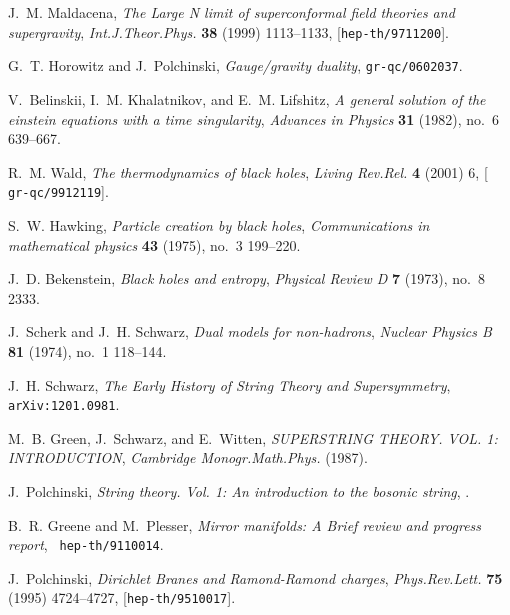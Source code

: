 \documentclass[12pt,a4paper]{article}
\begin{document}
\providecommand{\href}[2]{#2}\begingroup\raggedright\begin{thebibliography}{100}

J.~M. Maldacena, {\it {The Large N limit of superconformal field theories and
  supergravity}},  {\em Int.J.Theor.Phys.} {\bf 38} (1999) 1113--1133,
  [\href{http://xxx.lanl.gov/abs/hep-th/9711200}{{\tt hep-th/9711200}}].

G.~T. Horowitz and J.~Polchinski, {\it {Gauge/gravity duality}},
  \href{http://xxx.lanl.gov/abs/gr-qc/0602037}{{\tt gr-qc/0602037}}.

V.~Belinskii, I.~M. Khalatnikov, and E.~M. Lifshitz, {\it A general solution of
  the einstein equations with a time singularity},  {\em Advances in Physics}
  {\bf 31} (1982), no.~6 639--667.

R.~M. Wald, {\it {The thermodynamics of black holes}},  {\em Living Rev.Rel.}
  {\bf 4} (2001) 6, [\href{http://xxx.lanl.gov/abs/gr-qc/9912119}{{\tt
  gr-qc/9912119}}].

S.~W. Hawking, {\it Particle creation by black holes},  {\em Communications in
  mathematical physics} {\bf 43} (1975), no.~3 199--220.

J.~D. Bekenstein, {\it Black holes and entropy},  {\em Physical Review D} {\bf
  7} (1973), no.~8 2333.

J.~Scherk and J.~H. Schwarz, {\it Dual models for non-hadrons},  {\em Nuclear
  Physics B} {\bf 81} (1974), no.~1 118--144.

J.~H. Schwarz, {\it {The Early History of String Theory and Supersymmetry}},
  \href{http://xxx.lanl.gov/abs/1201.0981}{{\tt arXiv:1201.0981}}.

M.~B. Green, J.~Schwarz, and E.~Witten, {\it {SUPERSTRING THEORY. VOL. 1:
  INTRODUCTION}},  {\em Cambridge Monogr.Math.Phys.} (1987).

J.~Polchinski, {\it {String theory. Vol. 1: An introduction to the bosonic
  string}}, .

B.~R. Greene and M.~Plesser, {\it {Mirror manifolds: A Brief review and
  progress report}},  \href{http://xxx.lanl.gov/abs/hep-th/9110014}{{\tt
  hep-th/9110014}}.

J.~Polchinski, {\it {Dirichlet Branes and Ramond-Ramond charges}},  {\em
  Phys.Rev.Lett.} {\bf 75} (1995) 4724--4727,
  [\href{http://xxx.lanl.gov/abs/hep-th/9510017}{{\tt hep-th/9510017}}].


\end{thebibliography}
\end{document}
